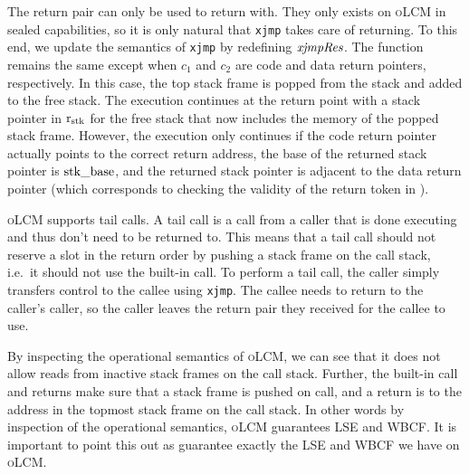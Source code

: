 \documentclass[acmsmall,review,anonymous]{acmart}\settopmatter{printfolios=true,printccs=false,printacmref=false}
\newcommand{\xjmpres}[1]{\plainfun{xjmpRes}{#1}}
\newcommand{\srccm}{\textsc{oLCM}}
\begin{document}
The return pair can only be used to return with.
They only exists on \srccm{} in sealed capabilities, so it is only natural that \texttt{xjmp} takes care of returning.
To this end, we update the semantics of \texttt{xjmp} by redefining $\xjmpres{}$.
The function remains the same except when $c_1$ and $c_2$ are code and data return pointers, respectively.
In this case, the top stack frame is popped from the stack and added to the free stack.
The execution continues at the return point with a stack pointer in $\mathrm{r}_\mathrm{stk}$ for the free stack that now includes the memory of the popped stack frame.
However, the execution only continues if the code return pointer actually points to the correct return address, the base of the returned stack pointer is $\mathrm{stk\_base}$, and the returned stack pointer is adjacent to the data return pointer (which corresponds to checking the validity of the return token in \stktokens{}).

\srccm{} supports tail calls.
A tail call is a call from a caller that is done executing and thus don't need to be returned to.
This means that a tail call should not reserve a slot in the return order by pushing a stack frame on the call stack, i.e.\ it should not use the built-in call.
To perform a tail call, the caller simply transfers control to the callee using \texttt{xjmp}.
The callee needs to return to the caller's caller, so the caller leaves the return pair they received for the callee to use.

By inspecting the operational semantics of \srccm{}, we can see that it does not allow reads from inactive stack frames on the call stack.
Further, the built-in call and returns make sure that a stack frame is pushed on call, and a return is to the address in the topmost stack frame on the call stack.
In other words by inspection of the operational semantics, \srccm{} guarantees LSE and WBCF.
It is important to point this out as \stktokens{} guarantee exactly the LSE and WBCF we have on \srccm{}.
\end{document}
